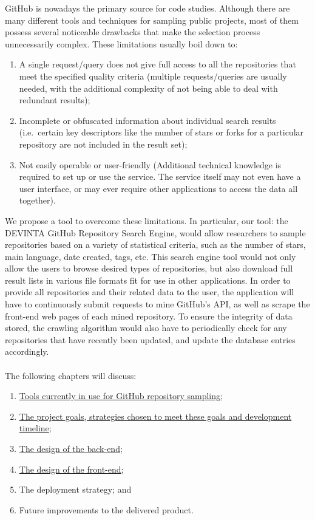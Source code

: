 GitHub is nowadays the primary source for code studies.
Although there are many different tools and techniques for sampling public projects, most of them possess several noticeable drawbacks that make the selection process unnecessarily complex.
These limitations usually boil down to:
\begin{enumerate}
    \item A single request/query does not give full access to all the repositories that meet the specified quality criteria (multiple requests/queries are usually needed, with the additional complexity of not being able to deal with redundant results);
    \item Incomplete or obfuscated information about individual search results (i.e.\ certain key descriptors like the number of stars or forks for a particular repository are not included in the result set);
    \item Not easily operable or user-friendly (Additional technical knowledge is required to set up or use the service. The service itself may not even have a user interface, or may ever require other applications to access the data all together).
\end{enumerate}

\newpage

We propose a tool to overcome these limitations.
In particular, our tool: the DEVINTA GitHub Repository Search Engine, would allow researchers to sample repositories based on a variety of statistical criteria, such as the number of stars, main language, date created, tags, etc.
This search engine tool would not only allow the users to browse desired types of repositories, but also download full result lists in various file formats fit for use in other applications.
In order to provide all repositories and their related data to the user, the application will have to continuously submit requests to mine GitHub's API, as well as scrape the front-end web pages of each mined repository.
To ensure the integrity of data stored, the crawling algorithm would also have to periodically check for any repositories that have recently been updated, and update the database entries accordingly.
\\\\
\noindent
The following chapters will discuss:
\begin{enumerate}
    \item \hyperref[ch:2]{Tools currently in use for GitHub repository sampling};
    \item \hyperref[ch:3]{The project goals, strategies chosen to meet these goals and development timeline};
    \item \hyperref[ch:4]{The design of the back-end};
    \item \hyperref[ch:5]{The design of the front-end};
    \item The deployment strategy; and
    \item Future improvements to the delivered product.
\end{enumerate}